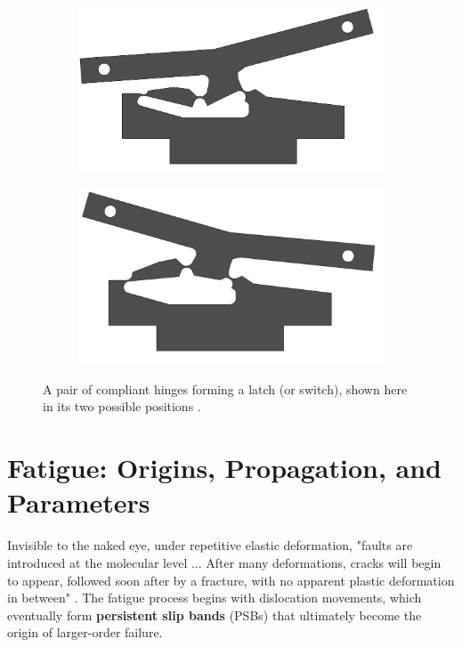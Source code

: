 \documentclass{report}
\begin{document}
\begin{figure}[h]
    \label{fig:latch}
    \centering
    \begin{subfigure}[b]{0.48\textwidth}
        \centering
        \includegraphics[width=\textwidth]{images/latchl.png}
    \end{subfigure}
    \hfill
    \begin{subfigure}[b]{0.48\textwidth}
        \centering
        \includegraphics[width=\textwidth]{images/latchr.png}
    \end{subfigure}
    \hfill
    \caption{A pair of compliant hinges forming a latch (or switch), shown here in its two possible positions \cite{wiki}.}
\end{figure}

\section{Fatigue: Origins, Propagation, and Parameters}

Invisible to the naked eye, under repetitive elastic deformation, "faults are introduced at the molecular level ... After many deformations, cracks will begin to appear, followed soon after by a fracture, with no apparent plastic deformation in between" \cite{fatigue}.
The fatigue process begins with dislocation movements, which eventually form \textbf{persistent slip bands} (PSBs) that ultimately become the origin of larger-order failure.
\end{document}
